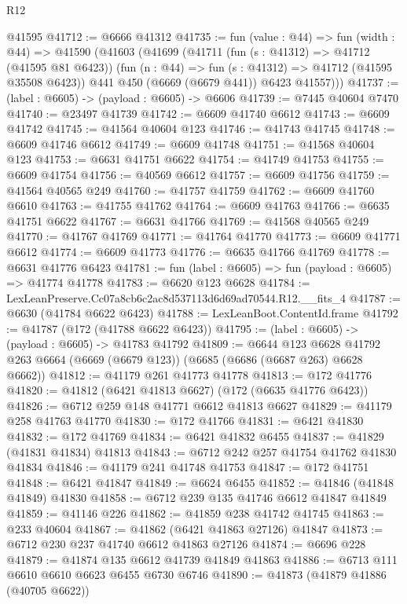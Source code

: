 \begin{lexlean}{R12}
\begin{coremodule}
    @41595
@41712 := @6666 @41312
@41735 := fun (value : @44) =>
  fun (width : @44) =>
  @41590
    (@41603
      (@41699
        (@41711
          (fun (s : @41312) => @41712 (@41595 @81 @6423))
          (fun (n : @44) => fun (s : @41312) => @41712 (@41595 @35508 @6423))
          @441
          @450
          (@6669 (@6679 @441))
          @6423
          @41557)))
@41737 := (label : @6605) -> (payload : @6605) -> @6606
@41739 := @7445 @40604 @7470
@41740 := @23497 @41739
@41742 := @6609 @41740 @6612
@41743 := @6609 @41742
@41745 := @41564 @40604 @123
@41746 := @41743 @41745
@41748 := @6609 @41746 @6612
@41749 := @6609 @41748
@41751 := @41568 @40604 @123
@41753 := @6631 @41751 @6622
@41754 := @41749 @41753
@41755 := @6609 @41754
@41756 := @40569 @6612
@41757 := @6609 @41756
@41759 := @41564 @40565 @249
@41760 := @41757 @41759
@41762 := @6609 @41760 @6610
@41763 := @41755 @41762
@41764 := @6609 @41763
@41766 := @6635 @41751 @6622
@41767 := @6631 @41766
@41769 := @41568 @40565 @249
@41770 := @41767 @41769
@41771 := @41764 @41770
@41773 := @6609 @41771 @6612
@41774 := @6609 @41773
@41776 := @6635 @41766 @41769
@41778 := @6631 @41776 @6423
@41781 := fun (label : @6605) => fun (payload : @6605) => @41774 @41778
@41783 := @6620 @123 @6628
@41784 := LexLeanPreserve.Cc07a8cb6c2ac8d537113d6d69ad70544.R12.__fits_4
@41787 := @6630 (@41784 @6622 @6423)
@41788 := LexLeanBoot.ContentId.frame
@41792 := @41787 (@172 (@41788 @6622 @6423))
@41795 := (label : @6605) -> (payload : @6605) -> @41783 @41792
@41809 := @6644
    @123
    @6628
    @41792
    @263
    @6664
    (@6669 (@6679 @123))
    (@6685 (@6686 (@6687 @263) @6628 @6662))
@41812 := @41179 @261 @41773 @41778
@41813 := @172 @41776
@41820 := @41812 (@6421 @41813 @6627) (@172 (@6635 @41776 @6423))
@41826 := @6712 @259 @148 @41771 @6612 @41813 @6627
@41829 := @41179 @258 @41763 @41770
@41830 := @172 @41766
@41831 := @6421 @41830
@41832 := @172 @41769
@41834 := @6421 @41832 @6455
@41837 := @41829 (@41831 @41834) @41813
@41843 := @6712 @242 @257 @41754 @41762 @41830 @41834
@41846 := @41179 @241 @41748 @41753
@41847 := @172 @41751
@41848 := @6421 @41847
@41849 := @6624 @6455
@41852 := @41846 (@41848 @41849) @41830
@41858 := @6712 @239 @135 @41746 @6612 @41847 @41849
@41859 := @41146 @226
@41862 := @41859 @238 @41742 @41745
@41863 := @233 @40604
@41867 := @41862 (@6421 @41863 @27126) @41847
@41873 := @6712 @230 @237 @41740 @6612 @41863 @27126
@41874 := @6696 @228
@41879 := @41874 @135 @6612 @41739 @41849 @41863
@41886 := @6713 @111 @6610 @6610 @6623 @6455 @6730 @6746
@41890 := @41873 (@41879 @41886 (@40705 @6622))

\end{coremodule}
\end{lexlean}
